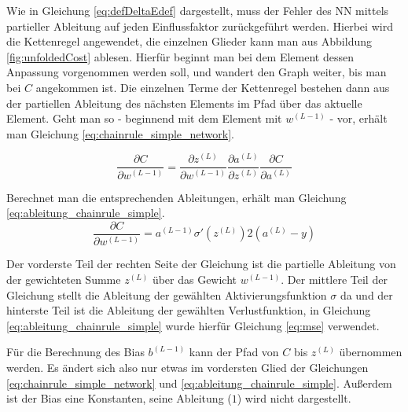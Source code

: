 
Wie in Gleichung \ref{eq:defDeltaEdef} dargestellt, muss der Fehler des \ac{NN} mittels partieller Ableitung auf jeden Einflussfaktor zurückgeführt werden. Hierbei wird die Kettenregel angewendet, die einzelnen Glieder kann man aus Abbildung \ref{fig:unfoldedCost} ablesen. Hierfür beginnt man bei dem Element dessen Anpassung vorgenommen werden soll, und wandert den Graph weiter, bis man bei $C$ angekommen ist. Die einzelnen Terme der Kettenregel bestehen dann aus der partiellen Ableitung des nächsten Elements im Pfad über das aktuelle Element. Geht man so - beginnend mit dem Element mit $w^{(L-1)}$ - vor, erhält man Gleichung \ref{eq:chainrule_simple_network}.

\begin{equation} \label{eq:chainrule_simple_network}
    \frac{\partial C }{\partial w^{(L-1)}} =  
    \frac{\partial z^{(L)} }{\partial w^{(L-1)}}
    \frac{\partial a^{(L)} }{\partial z^{(L)}}
    \frac{\partial C }{\partial a^{(L)}}
\end{equation}

Berechnet man die entsprechenden Ableitungen, erhält man Gleichung \ref{eq:ableitung_chainrule_simple}.
\begin{equation} \label{eq:ableitung_chainrule_simple}
    \frac{\partial C }{\partial w^{(L-1)}} = 
    a^{(L-1)} \sigma'(z^{(L)})
    2(a^{(L)}-y)
\end{equation}

Der vorderste Teil der rechten Seite der Gleichung ist die partielle Ableitung von der gewichteten Summe $z^{(L)}$ über das Gewicht $w^{(L-1)}$. Der mittlere Teil der Gleichung stellt die Ableitung der gewählten Aktivierungsfunktion $\sigma$ da und der hinterste Teil ist die Ableitung der gewählten Verlustfunktion, in Gleichung \ref{eq:ableitung_chainrule_simple} wurde hierfür Gleichung \ref{eq:mse} verwendet.

Für die Berechnung des Bias $b^{(L-1)}$ kann der Pfad von $C$ bis $z^{(L)}$ übernommen werden. Es ändert sich also nur etwas im vordersten Glied der Gleichungen \ref{eq:chainrule_simple_network} und \ref{eq:ableitung_chainrule_simple}. Außerdem ist der Bias eine Konstanten, seine Ableitung ($1$)  wird nicht dargestellt.

